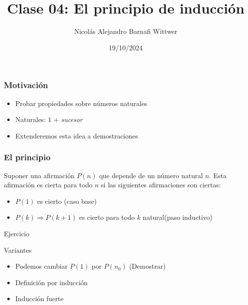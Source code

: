\documentclass[14pt,aspectratio=169,xcolor=dvipsnames]{beamer}
\title[short title]{Clase 04: El principio de inducción}
\subtitle{}
\author[NA Barnafi] {Nicolás Alejandro Barnafi Wittwer}
\institute[UC|CMM] 
{
    Pontificia Universidad Católica de Chile \\
    Centro de Modelamiento Matemático
}
\date{19/10/2024}
\begin{document}
\begin{frame}
    \maketitle
\end{frame}
\begin{frame}\frametitle{Motivación}
    \begin{itemize}
        \item Probar propiedades sobre números naturales
        \item Naturales: $1$ + \emph{sucesor}
        \item Extenderemos esta idea a demostraciones
    \end{itemize}
\end{frame}
\begin{frame}\frametitle{El principio}
    \begin{block}{}
        Suponer una afirmación $P(n)$ que depende de un número natural $n$. Esta afirmación es cierta para todo $n$ si las siguientes afirmaciones son ciertas:
        \begin{itemize}
            \item $P(1)$ es cierto \hfill \alert{(caso base)}
            \item $P(k) \Rightarrow P(k+1)$ es cierto para todo $k$ natural\hfill \alert{(paso inductivo)}
        \end{itemize}
    \end{block}
    \pause {}
\end{frame}
\begin{frame}{Ejercicio}
    \begin{center}
\end{center}
\end{frame}
\begin{frame}{Variantes}
    \begin{itemize}
        \item Podemos cambiar $P(1)$ por  $P(n_0)$ (Demostrar)
        \item Definición por inducción
        \item Inducción fuerte
    \end{itemize}
\end{frame}
\end{document}
